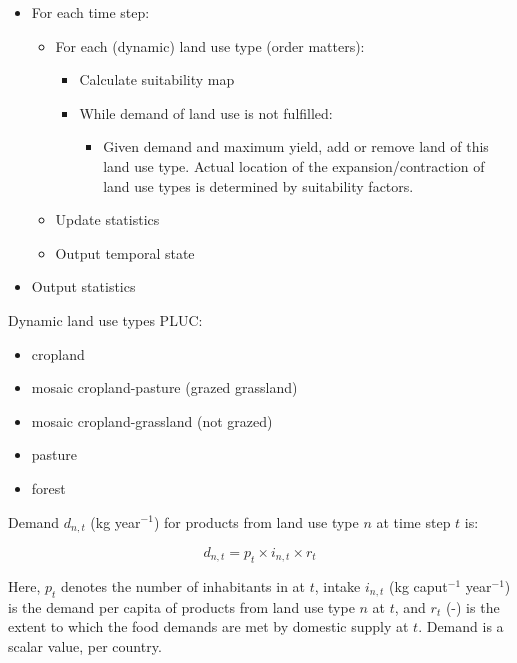 \documentclass[a4paper,12pt]{article}
\begin{document}
\begin{itemize}
    \item For each time step:
        \begin{itemize}
            \item For each (dynamic) land use type (order matters):
                \begin{itemize}
                    \item Calculate suitability map
                    \item While demand of land use is not fulfilled:
                        \begin{itemize}
                            \item Given demand and maximum yield, add
                                or remove land of this land
                                use type. Actual location of the
                                expansion/contraction of land use types
                                is determined by suitability factors.
                        \end{itemize}
                \end{itemize}
            \item Update statistics
            \item Output temporal state
        \end{itemize}
    \item Output statistics
\end{itemize}

Dynamic land use types PLUC:
\begin{itemize}
    \item cropland
    \item mosaic cropland-pasture (grazed grassland)
    \item mosaic cropland-grassland (not grazed)
    \item pasture
    \item forest
\end{itemize}

Demand $d_{n,t}$ (kg year$^{-1}$) for products from land use type $n$
at time step $t$ is:

\begin{equation}
    d_{n,t} = p_t \times i_{n,t} \times r_t
\end{equation}

Here, $p_t$ denotes the number of inhabitants
in at $t$, intake $i_{n,t}$ (kg caput$^{-1}$ year$^{-1}$) is the demand
per capita of products from land use type $n$ at $t$, and $r_t$ (-)
is the extent to which the food demands are met by domestic supply at $t$.
Demand is a scalar value, per country.
\end{document}
